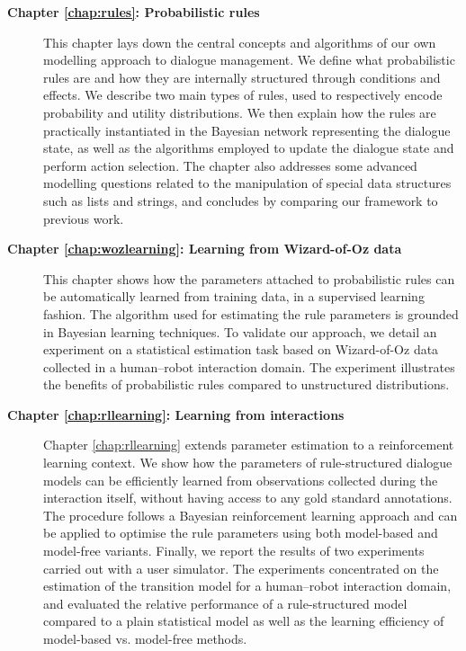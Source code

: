 \begin{description}
  \item[\textbf{Chapter \ref{chap:rules}: Probabilistic rules}] \hfill \vspace{2mm}
 
  This chapter lays down the central concepts and algorithms of our own modelling approach to dialogue management. We define what probabilistic rules are and how they are internally structured through conditions and effects.  We describe two main types of rules, used to respectively encode probability and utility distributions. We then explain how the rules are practically instantiated in the Bayesian network representing the dialogue state, as well as the algorithms employed to update the dialogue state and perform action selection. The chapter also addresses some advanced modelling questions related to the manipulation of special data structures such as lists and strings, and concludes by comparing our framework to previous work. \vspace{2mm}
  
  \item[\textbf{Chapter \ref{chap:wozlearning}: Learning from Wizard-of-Oz data}] \hfill  \vspace{2mm}
  
 This chapter shows how the parameters attached to probabilistic rules can be automatically learned from training data, in a supervised learning fashion. The algorithm used for estimating the rule parameters is grounded in Bayesian learning techniques.  To validate our approach, we detail an experiment on a statistical estimation task based on Wizard-of-Oz data collected in a human--robot interaction domain.  The experiment illustrates the benefits of probabilistic rules compared to unstructured distributions.  \vspace{2mm}

\item [\textbf{Chapter \ref{chap:rllearning}: Learning from interactions}] \hfill  \vspace{2mm}

Chapter \ref{chap:rllearning} extends parameter estimation to a reinforcement learning context.  We show how the parameters of rule-structured dialogue models can be efficiently learned from observations collected during the interaction itself, without having access to any gold standard annotations.  The procedure follows a Bayesian reinforcement learning approach and can be applied to optimise the rule parameters using both model-based and model-free variants. Finally, we report the results of two experiments carried out with a user simulator.  The experiments concentrated on the estimation of the transition model for a human--robot interaction domain, and evaluated the relative performance of a rule-structured model compared to a plain statistical model as well as the learning efficiency of model-based vs. model-free methods.   \vspace{2mm}



\end{description}
